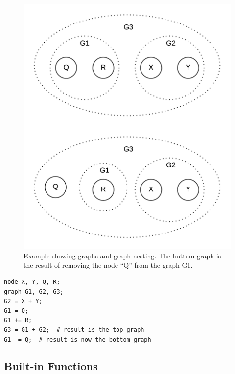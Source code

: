 \documentclass{article}
\begin{document}
\begin{figure}[H]
\centering
\includegraphics{graphs/graph_ops_example.png}
\caption{Example showing graphs and graph nesting. The bottom graph is the result of removing the node ``Q'' from the graph G1.}
\label{fig:graph-ops}
\end{figure}

\begin{lstlisting}[language=pltLang, caption=Shows the use of graph operators that creates the top graph in Figure \ref{fig:graph-ops} and then alters it to the bottom graph shown., label=lst:graph-ops]
node X, Y, Q, R;
graph G1, G2, G3;
G2 = X + Y;
G1 = Q;
G1 += R;
G3 = G1 + G2;  # result is the top graph
G1 -= Q;  # result is now the bottom graph

\end{lstlisting}

\subsection{Built-in Functions}
\end{document}
